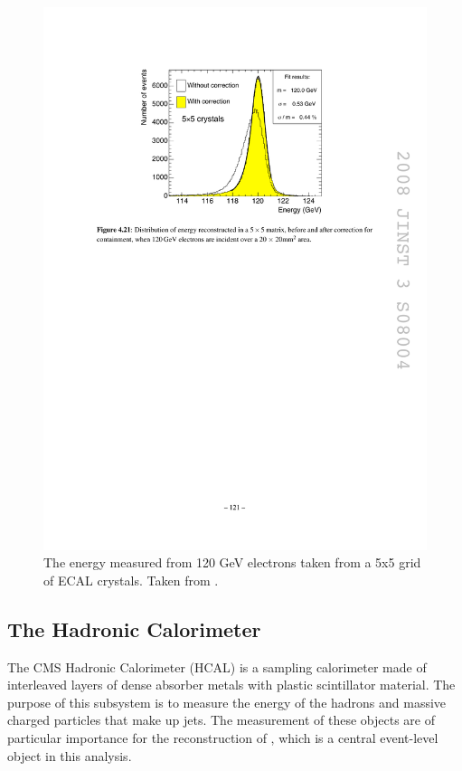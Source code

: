     \begin{figure}[h!]
      \centering
      \includegraphics[width=.7\textwidth]{figures/ecal_resolution.pdf}
      \caption{The energy measured from 120 GeV electrons taken from a 5x5 grid of ECAL crystals. Taken from \cite{cms_jinst}.}
      \label{fig:ecal_resolution}
    \end{figure}

  \subsection{The Hadronic Calorimeter}
    The CMS Hadronic Calorimeter (HCAL) is a sampling calorimeter made of interleaved layers of dense absorber metals with plastic scintillator material. The purpose of this subsystem is to measure the energy of the hadrons and massive charged particles that make up jets. The measurement of these objects are of particular importance for the reconstruction of \MET, which is a central event-level object in this analysis.

